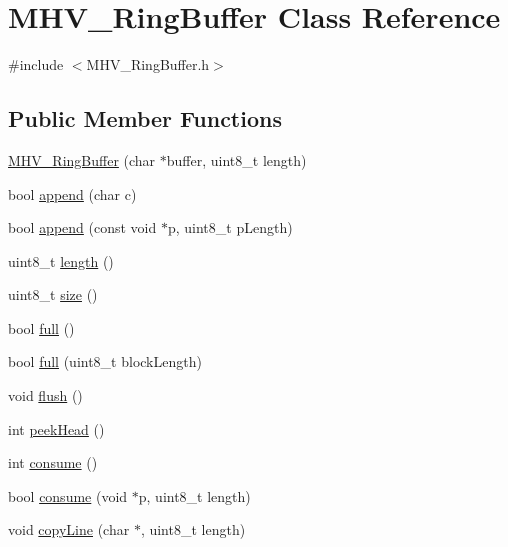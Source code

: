 \hypertarget{class_m_h_v___ring_buffer}{
\section{\-M\-H\-V\-\_\-\-Ring\-Buffer \-Class \-Reference}
\label{class_m_h_v___ring_buffer}
}


{\ttfamily \#include $<$\-M\-H\-V\-\_\-\-Ring\-Buffer.\-h$>$}

\subsection*{\-Public \-Member \-Functions}
\begin{DoxyCompactItemize}
\item 
\hyperlink{class_m_h_v___ring_buffer_a55648511cbc03ac09ddc8e9c2a7d96ec}{\-M\-H\-V\-\_\-\-Ring\-Buffer} (char $\ast$buffer, uint8\-\_\-t length)
\item 
bool \hyperlink{class_m_h_v___ring_buffer_ae9fb1751555f666d4d7dd9ff5b8d4684}{append} (char c)
\item 
bool \hyperlink{class_m_h_v___ring_buffer_a71e1ef04975d8884fc70d6ea80f6c22f}{append} (const void $\ast$p, uint8\-\_\-t p\-Length)
\item 
uint8\-\_\-t \hyperlink{class_m_h_v___ring_buffer_a0f83a4149c40b8ab7eca9712b37d14fe}{length} ()
\item 
uint8\-\_\-t \hyperlink{class_m_h_v___ring_buffer_a52243d7e19970b121ca8623dd662cb43}{size} ()
\item 
bool \hyperlink{class_m_h_v___ring_buffer_a72eb6f83c4ddb6a23275cdd3f1030d07}{full} ()
\item 
bool \hyperlink{class_m_h_v___ring_buffer_aaaa5e7fff0c1b7e748c4278096a8b5b1}{full} (uint8\-\_\-t block\-Length)
\item 
void \hyperlink{class_m_h_v___ring_buffer_aa9e34685f3881cc967493e3e8c9b839e}{flush} ()
\item 
int \hyperlink{class_m_h_v___ring_buffer_a4537605236df3aa7c91fff9d95d50d05}{peek\-Head} ()
\item 
int \hyperlink{class_m_h_v___ring_buffer_addec99c97519a0241e7d4be65e432df6}{consume} ()
\item 
bool \hyperlink{class_m_h_v___ring_buffer_af4d35b76c16bd42d9c5568b084310eeb}{consume} (void $\ast$p, uint8\-\_\-t length)
\item 
void \hyperlink{class_m_h_v___ring_buffer_a8232f22addc138be447ada8393554961}{copy\-Line} (char $\ast$, uint8\-\_\-t length)
\end{DoxyCompactItemize}


